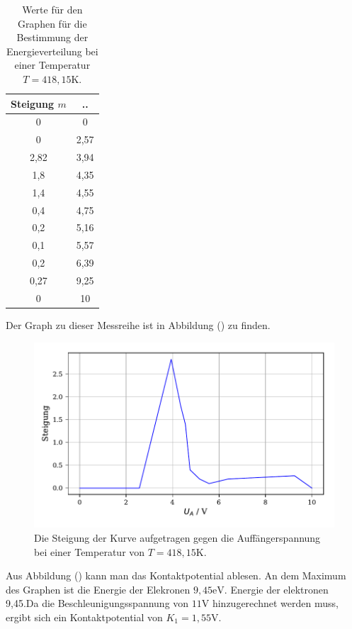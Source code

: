 \begin{table}[H]
  \centering
  \caption{Werte für den Graphen für die Bestimmung der Energieverteilung bei einer Temperatur $T=418,15$K.}
  \label{tab:Parameter}
  \begin{tabular}{c c}
    \toprule
    Steigung $m$ &  .. \\
    \bottomrule
    0 & 0\\
    0 & 2,57\\
    2,82 & 3,94\\
    1,8 &4,35\\
    1,4 &4,55\\
    0,4 &4,75\\
    0,2 &5,16\\
    0,1 &5,57\\
    0,2&6,39\\
    0,27 &9,25\\
    0 &10\\
  
    \bottomrule
  \end{tabular}
\end{table}

Der Graph zu dieser Messreihe ist in Abbildung () zu finden.

\begin{figure}[H]
  \centering
  \includegraphics{plota2.pdf}
  \caption{Die Steigung der Kurve aufgetragen gegen die Auffängerspannung bei einer Temperatur von $T=418,15$K.}
  \label{fig:plot}
\end{figure}

\noindent Aus Abbildung () kann man das Kontaktpotential ablesen. 
An dem Maximum des Graphen ist die Energie der Elekronen $9,45\si{\eV}$.
Energie der elektronen 9,45.Da die Beschleunigungsspannung von $11\si{\V}$ hinzugerechnet werden muss, ergibt sich
ein Kontaktpotential von $K_1 = 1,55 \si{\V}$.

